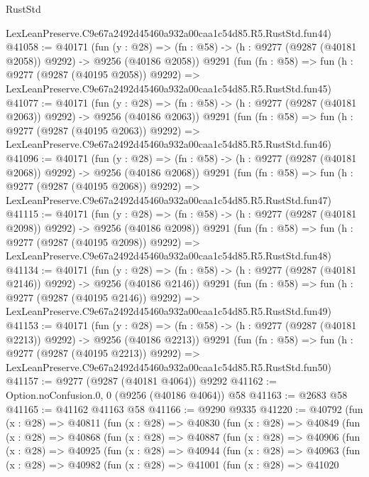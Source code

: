 \begin{lexlean}{RustStd}
\begin{coremodule}
    LexLeanPreserve.C9e67a2492d45460a932a00caa1c54d85.R5.RustStd.fun44)
@41058 := @40171
    (fun (y : @28) =>
    (fn : @58) -> (h : @9277 (@9287 (@40181 @2058)) @9292) -> @9256 (@40186 @2058))
    @9291
    (fun (fn : @58) =>
    fun (h : @9277 (@9287 (@40195 @2058)) @9292) =>
    LexLeanPreserve.C9e67a2492d45460a932a00caa1c54d85.R5.RustStd.fun45)
@41077 := @40171
    (fun (y : @28) =>
    (fn : @58) -> (h : @9277 (@9287 (@40181 @2063)) @9292) -> @9256 (@40186 @2063))
    @9291
    (fun (fn : @58) =>
    fun (h : @9277 (@9287 (@40195 @2063)) @9292) =>
    LexLeanPreserve.C9e67a2492d45460a932a00caa1c54d85.R5.RustStd.fun46)
@41096 := @40171
    (fun (y : @28) =>
    (fn : @58) -> (h : @9277 (@9287 (@40181 @2068)) @9292) -> @9256 (@40186 @2068))
    @9291
    (fun (fn : @58) =>
    fun (h : @9277 (@9287 (@40195 @2068)) @9292) =>
    LexLeanPreserve.C9e67a2492d45460a932a00caa1c54d85.R5.RustStd.fun47)
@41115 := @40171
    (fun (y : @28) =>
    (fn : @58) -> (h : @9277 (@9287 (@40181 @2098)) @9292) -> @9256 (@40186 @2098))
    @9291
    (fun (fn : @58) =>
    fun (h : @9277 (@9287 (@40195 @2098)) @9292) =>
    LexLeanPreserve.C9e67a2492d45460a932a00caa1c54d85.R5.RustStd.fun48)
@41134 := @40171
    (fun (y : @28) =>
    (fn : @58) -> (h : @9277 (@9287 (@40181 @2146)) @9292) -> @9256 (@40186 @2146))
    @9291
    (fun (fn : @58) =>
    fun (h : @9277 (@9287 (@40195 @2146)) @9292) =>
    LexLeanPreserve.C9e67a2492d45460a932a00caa1c54d85.R5.RustStd.fun49)
@41153 := @40171
    (fun (y : @28) =>
    (fn : @58) -> (h : @9277 (@9287 (@40181 @2213)) @9292) -> @9256 (@40186 @2213))
    @9291
    (fun (fn : @58) =>
    fun (h : @9277 (@9287 (@40195 @2213)) @9292) =>
    LexLeanPreserve.C9e67a2492d45460a932a00caa1c54d85.R5.RustStd.fun50)
@41157 := @9277 (@9287 (@40181 @4064)) @9292
@41162 := Option.noConfusion.{0, 0} (@9256 (@40186 @4064)) @58
@41163 := @2683 @58
@41165 := @41162 @41163 @58
@41166 := @9290 @9335
@41220 := @40792
    (fun (x : @28) =>
    @40811
      (fun (x : @28) =>
      @40830
        (fun (x : @28) =>
        @40849
          (fun (x : @28) =>
          @40868
            (fun (x : @28) =>
            @40887
              (fun (x : @28) =>
              @40906
                (fun (x : @28) =>
                @40925
                  (fun (x : @28) =>
                  @40944
                    (fun (x : @28) =>
                    @40963
                      (fun (x : @28) =>
                      @40982
                        (fun (x : @28) =>
                        @41001
                          (fun (x : @28) =>
                          @41020

\end{coremodule}
\end{lexlean}
